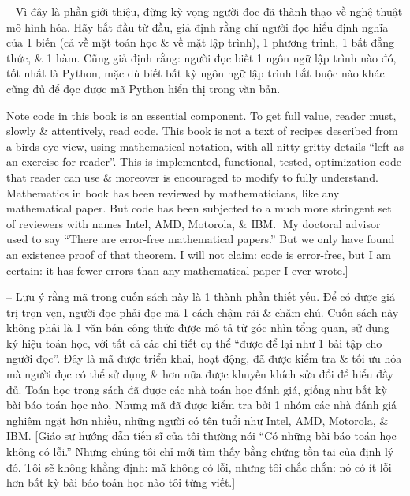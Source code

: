 \documentclass{article}
\begin{document}
\begin{itemize}
\begin{itemize}
        -- Vì đây là phần giới thiệu, đừng kỳ vọng người đọc đã thành thạo về nghệ thuật mô hình hóa. Hãy bắt đầu từ đầu, giả định rằng chỉ người đọc hiểu định nghĩa của 1 biến (cả về mặt toán học \& về mặt lập trình), 1 phương trình, 1 bất đẳng thức, \& 1 hàm. Cũng giả định rằng: người đọc biết 1 ngôn ngữ lập trình nào đó, tốt nhất là Python, mặc dù biết bất kỳ ngôn ngữ lập trình bắt buộc nào khác cũng đủ để đọc được mã Python hiển thị trong văn bản.

        Note code in this book is an essential component. To get full value, reader must, slowly \& attentively, read code. This book is not a text of recipes described from a birds-eye view, using mathematical notation, with all nitty-gritty details ``left as an exercise for reader''. This is implemented, functional, tested, optimization code that reader can use \& moreover is encouraged to modify to fully understand. Mathematics in book has been reviewed by mathematicians, like any mathematical paper. But code has been subjected to a much more stringent set of reviewers with names Intel, AMD, Motorola, \& IBM. [My doctoral advisor used to say ``There are error-free mathematical papers.'' But we only have found an existence proof of that theorem. I will not claim: code is error-free, but I am certain: it has fewer errors than any mathematical paper I ever wrote.]

        -- Lưu ý rằng mã trong cuốn sách này là 1 thành phần thiết yếu. Để có được giá trị trọn vẹn, người đọc phải đọc mã 1 cách chậm rãi \& chăm chú. Cuốn sách này không phải là 1 văn bản công thức được mô tả từ góc nhìn tổng quan, sử dụng ký hiệu toán học, với tất cả các chi tiết cụ thể ``được để lại như 1 bài tập cho người đọc''. Đây là mã được triển khai, hoạt động, đã được kiểm tra \& tối ưu hóa mà người đọc có thể sử dụng \& hơn nữa được khuyến khích sửa đổi để hiểu đầy đủ. Toán học trong sách đã được các nhà toán học đánh giá, giống như bất kỳ bài báo toán học nào. Nhưng mã đã được kiểm tra bởi 1 nhóm các nhà đánh giá nghiêm ngặt hơn nhiều, những người có tên tuổi như Intel, AMD, Motorola, \& IBM. [Giáo sư hướng dẫn tiến sĩ của tôi thường nói ``Có những bài báo toán học không có lỗi.'' Nhưng chúng tôi chỉ mới tìm thấy bằng chứng tồn tại của định lý đó. Tôi sẽ không khẳng định: mã không có lỗi, nhưng tôi chắc chắn: nó có ít lỗi hơn bất kỳ bài báo toán học nào tôi từng viết.]


\end{itemize}
\end{itemize}
\end{document}
